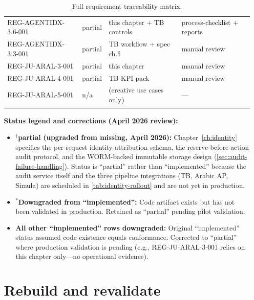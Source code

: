 \begin{longtable}{p{3.5cm}p{1.6cm}p{4.6cm}p{3.6cm}}
REG-AGENTIDX-3.6-001 & partial    & this chapter + TB controls                  & process-checklist + reports \\
REG-AGENTIDX-3.3-001 & partial    & TB workflow + spec ch.5                     & manual review \\
REG-JU-ARAL-3-001 & partial       & this chapter                                & manual review \\
REG-JU-ARAL-4-001 & partial       & TB KPI pack                                 & manual review \\
REG-JU-ARAL-5-001 & n/a           & (creative use cases only)                   & --- \\
\bottomrule
\caption{Full requirement traceability matrix.}
\label{tab:trace}
\end{longtable}

\normalsize
\noindent\textbf{Status legend and corrections (April 2026 review):}
\begin{itemize}[nosep]
  \item $^\dagger$\textbf{partial (upgraded from missing, April 2026):}
        Chapter~\ref{ch:identity} specifies the per-request
        identity-attribution schema, the reserve-before-action audit
        protocol, and the WORM-backed immutable storage design
        (\cref{sec:audit-failure-handling}). Status is ``partial''
        rather than ``implemented'' because the audit service itself
        and the three pipeline integrations (TB, Arabic AP, Simula)
        are scheduled in \cref{tab:identity-rollout} and are not yet
        in production.
  \item $^*$\textbf{Downgraded from ``implemented'':} Code artifact exists but has not been
        validated in production. Retained as ``partial'' pending pilot validation.
  \item \textbf{All other ``implemented'' rows downgraded:} Original ``implemented'' status
        assumed code existence equals conformance. Corrected to ``partial'' where
        production validation is pending (e.g., REG-JU-ARAL-3-001 relies on this
        chapter only---no operational evidence).
\end{itemize}

\section{Rebuild and revalidate}


